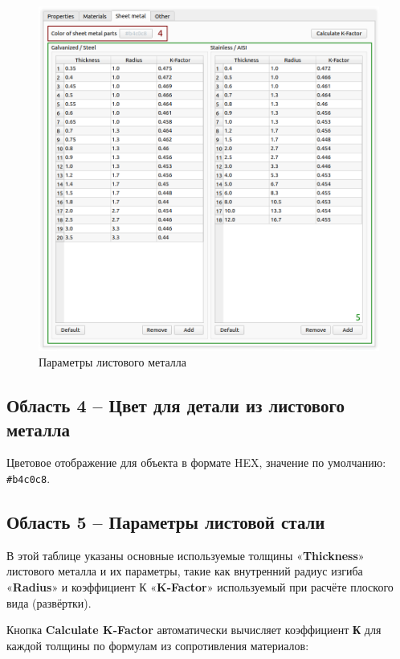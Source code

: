 \documentclass[a4paper,12pt]{article}
\begin{document}
\pagebreak


\begin{figure}[htp]
	\centering
	\includegraphics[width=1\textwidth]{img/pref_sm.png}
	\caption{Параметры листового металла}
	\label{sec:pref_sm}
\end{figure}

\subsection{Область 4 -- Цвет для детали из листового металла}
Цветовое отображение для объекта в формате HEX, значение по умолчанию: \verb|#b4c0c8|.

\subsection{Область 5 -- Параметры листовой стали}
В этой таблице указаны основные используемые толщины «\textbf{Thickness}» листового металла и их параметры, такие как внутренний радиус изгиба «\textbf{Radius}» и коэффициент К «\textbf{K-Factor}» используемый при расчёте плоского вида (развёртки).\\

\pagebreak


Кнопка \textbf{Calculate K-Factor} автоматически вычисляет коэффициент \textbf{К} для каждой толщины по формулам из сопротивления материалов:
\end{document}
